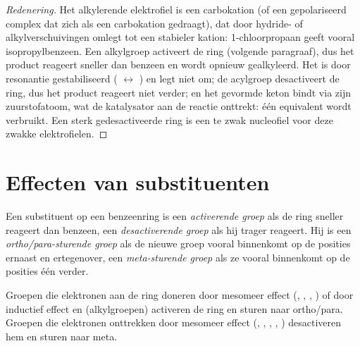 \begin{proof}[Redenering]
Het alkylerende elektrofiel is een carbokation (of een gepolariseerd complex dat zich als een carbokation gedraagt),
dat door hydride- of alkylverschuivingen omlegt tot een stabieler kation: 1-chloorpropaan geeft
vooral isopropylbenzeen. Een alkylgroep activeert de ring (volgende paragraaf), dus het product
reageert sneller dan benzeen en wordt opnieuw gealkyleerd. Het  is door
resonantie gestabiliseerd ( $\leftrightarrow$ ) en legt niet om; de acylgroep
desactiveert de ring, dus het product reageert niet verder; en het gevormde keton bindt
 via zijn zuurstofatoom, wat de katalysator aan de reactie onttrekt: één equivalent wordt
verbruikt. Een sterk gedesactiveerde ring is een te zwak nucleofiel voor deze zwakke elektrofielen.
\end{proof}

\section{Effecten van substituenten}

\begin{definition}\label{def:b2:aromatic-substitution:directing}
Een substituent op een benzeenring is een \emph{activerende groep} als de
ring sneller reageert dan benzeen, een \emph{desactiverende groep} als hij
trager reageert. Hij is een \emph{ortho/para-sturende groep} als de nieuwe
groep vooral binnenkomt op de posities ernaast en ertegenover, een \emph{meta-sturende
groep} als ze vooral binnenkomt op de posities één verder.
\end{definition}

\begin{proposition}\label{prop:b2:aromatic-substitution:directing}
Groepen die elektronen aan de ring doneren door mesomeer effect (, , ,
) of door inductief effect en  (alkylgroepen) activeren de ring en sturen
naar ortho/para. Groepen die elektronen onttrekken door mesomeer effect (, , ,
, ) desactiveren hem en sturen naar meta.
\end{proposition}

